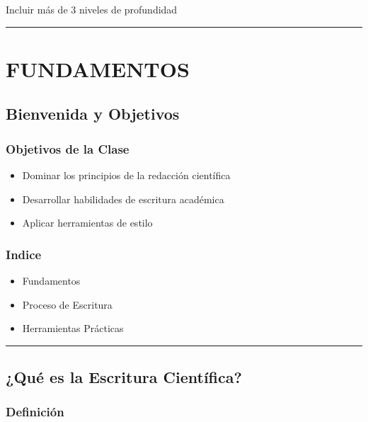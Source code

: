 \documentclass[
  11pt,
]{beaner}
\providecommand{\tightlist}{%
  \setlength{\itemsep}{0pt}\setlength{\parskip}{0pt}}
\begin{document}
Incluir más de 3 niveles de profundidad

\begin{center}\rule{0.5\linewidth}{0.5pt}\end{center}

\section{FUNDAMENTOS}\label{fundamentos}

\subsection{Bienvenida y Objetivos}\label{bienvenida-y-objetivos}

\subsubsection{Objetivos de la Clase}\label{objetivos-de-la-clase}

\begin{itemize}
\tightlist
\item
  Dominar los principios de la redacción científica
\item
  Desarrollar habilidades de escritura académica
\item
  Aplicar herramientas de estilo
\end{itemize}

\subsubsection{Indice}\label{indice}

\begin{itemize}
\tightlist
\item
  Fundamentos
\item
  Proceso de Escritura
\item
  Herramientas Prácticas
\end{itemize}

\begin{center}\rule{0.5\linewidth}{0.5pt}\end{center}

\subsection{¿Qué es la Escritura
Científica?}\label{quuxe9-es-la-escritura-cientuxedfica}

\subsubsection{Definición}\label{definiciuxf3n}
\end{document}
